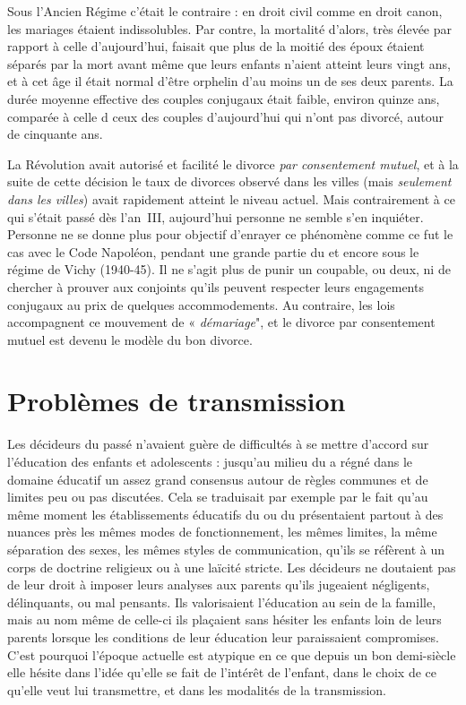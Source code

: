 \begin{table}[t]
\begin{table}[t]
 Sous l'Ancien Régime c'était le contraire : en droit civil comme en droit canon, les mariages étaient indissolubles. Par contre, la mortalité d'alors, très élevée par rapport à celle d'aujourd'hui, faisait que plus de la moitié des époux étaient séparés par la mort avant même que leurs enfants n'aient atteint leurs vingt ans, et à cet âge il était normal d'être orphelin d'au moins un de ses deux parents. La durée moyenne effective des couples conjugaux était faible, environ quinze ans, comparée à celle d ceux des couples d'aujourd'hui qui n'ont pas divorcé, autour de cinquante ans. 

 La Révolution avait autorisé et facilité le divorce \emph{par consentement mutuel}, et à la suite de cette décision le taux de divorces observé dans les villes (mais \emph{seulement dans les villes}) avait rapidement atteint le niveau actuel. Mais contrairement à ce qui s'était passé dès l'an~III, aujourd'hui personne ne semble s'en inquiéter. Personne ne se donne plus pour objectif d'enrayer ce phénomène comme ce fut le cas avec le Code Napoléon, pendant une grande partie du  et encore sous le régime de Vichy (1940-45). Il ne s'agit plus de punir un coupable, ou deux, ni de chercher à prouver aux conjoints qu'ils peuvent respecter leurs engagements conjugaux au prix de quelques accommodements. Au contraire, les lois accompagnent ce mouvement de « \emph{démariage}", et le divorce par consentement mutuel est devenu le modèle du bon divorce. 

 


 


 
\section{Problèmes de transmission}


 Les décideurs du passé n'avaient guère de difficultés à se mettre d'accord sur l'éducation des enfants et adolescents : jusqu'au milieu du  a régné dans le domaine éducatif un assez grand consensus autour de règles communes et de limites peu ou pas discutées. Cela se traduisait par exemple par le fait qu'au même moment les établissements éducatifs du  ou du  présentaient partout à des nuances près les mêmes modes de fonctionnement, les mêmes limites, la même séparation des sexes, les mêmes styles de communication, qu'ils se réfèrent à un corps de doctrine religieux ou à une laïcité stricte. Les décideurs ne doutaient pas de leur droit à imposer leurs analyses aux parents qu'ils jugeaient négligents, délinquants, ou mal pensants. Ils valorisaient l'éducation au sein de la famille, mais au nom même de celle-ci ils plaçaient sans hésiter les enfants loin de leurs parents lorsque les conditions de leur éducation leur paraissaient compromises. C'est pourquoi l'époque actuelle est atypique en ce que depuis un bon demi-siècle elle hésite dans l'idée qu'elle se fait de l'intérêt de l'enfant, dans le choix de ce qu'elle veut lui transmettre, et dans les modalités de la transmission. 


\end{table}
\end{table}

